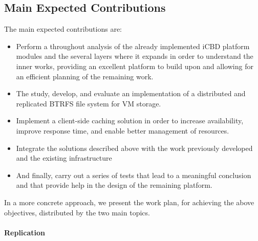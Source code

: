 


\subsection{Main Expected Contributions} %
\label{sub:main_expected_contributions}

The main expected contributions are: 

\begin{itemize}
  \item Perform a throughout analysis of the already implemented iCBD platform modules and the several layers where it expands in order to understand the inner works, providing an excellent platform to build upon and allowing for an efficient planning of the remaining work. 
  \item The study, develop, and evaluate an implementation of a distributed and replicated BTRFS file system for VM storage.
  \item Implement a client-side caching solution in order to increase availability, improve response time, and enable better management of resources.
  \item Integrate the solutions described above  with the work previously developed and the existing infrastructure
  \item And finally, carry out a series of tests that lead to a meaningful conclusion and that provide help in the design of the remaining platform.
\end{itemize}


In a more concrete approach, we present the work plan, for achieving the above objectives, distributed by the two main topics.


\paragraph{Replication}
\label{par:replication_goals}

